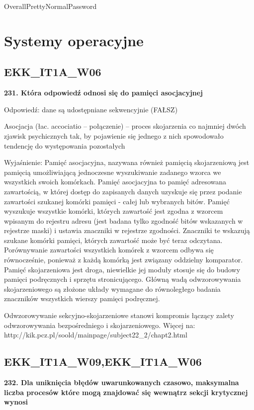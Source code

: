 OverallPrettyNormalPassword
\chapter{Systemy operacyjne}
\PartialToc
\section{EKK\_IT1A\_W06}
\textbf{231. Która odpowiedź odnosi się do pamięci asocjacyjnej}

\vspace{0.4cm}

Odpowiedź: dane są udostępniane sekwencyjnie (FAŁSZ)


Asocjacja (łac. accociatio – połączenie) – proces skojarzenia co najmniej dwóch zjawisk psychicznych tak, by pojawienie się jednego z nich spowodowało tendencję do występowania pozostałych

Wyjaśnienie:
Pamięć asocjacyjna, nazywana również pamięcią skojarzeniową jest pamięcią umożliwiającą jednoczesne wyszukiwanie zadanego wzorca we wszystkich swoich komórkach.
Pamięć asocjacyjna to pamięć adresowana zawartością, w której dostęp do zapisanych danych uzyskuje się przez podanie zawartości szukanej komórki pamięci - całej lub wybranych bitów.
Pamięć wyszukuje wszystkie komórki, których zawartość jest zgodna z wzorcem wpisanym do rejestru adresu (jest badana tylko zgodność bitów wskazanych w rejestrze maski)
i ustawia znaczniki w rejestrze zgodności. Znaczniki te wskazują szukane komórki pamięci, których zawartość może być teraz odczytana.
Porównywanie zawartości wszystkich komórek z wzorcem odbywa się równocześnie, ponieważ z każdą komórką jest związany oddzielny komparator.
Pamięć skojarzeniowa jest droga, niewielkie jej moduły stosuje się do budowy pamięci podręcznych i sprzętu stronicującego.
Główną wadą odwzorowywania skojarzeniowego są złożone układy wymagane do równoległego badania znaczników wszystkich wierszy pamięci podręcznej.


Odwzorowywanie sekcyjno-skojarzeniowe stanowi kompromis łączący zalety odwzorowywania bezpośredniego i skojarzeniowego.
Więcej na: 	http://kik.pcz.pl/soold/mainpage/subject22_2/chapt2.html



\section{EKK\_IT1A\_W09,EKK\_IT1A\_W06}
\textbf{232. Dla uniknięcia błędów uwarunkowanych czasowo, maksymalna liczba procesów które mogą znajdować się wewnątrz sekcji krytycznej wynosi}

